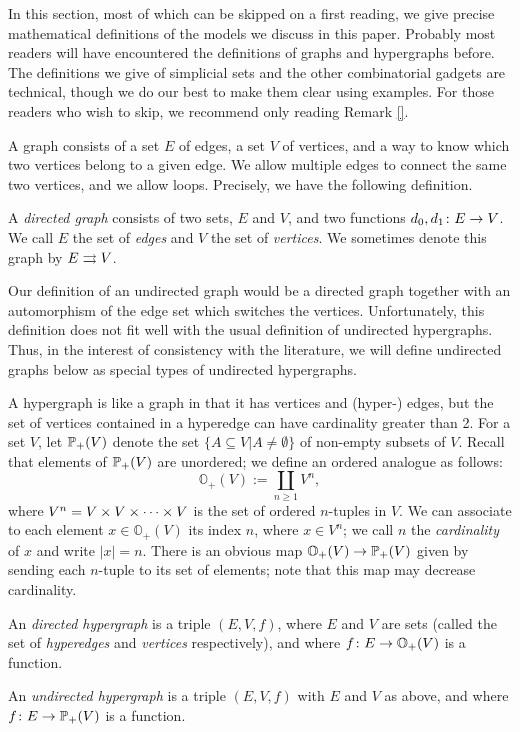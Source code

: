 \documentclass{amsart}
\def\ss{\subseteq}
\def\OO{{\mathbb O}}
\begin{document}
In this section, most of which can be skipped on a first reading, we give precise mathematical definitions of the models we discuss in this paper.  Probably most readers will have encountered the definitions of graphs and hypergraphs before.  The definitions we give of simplicial sets and the other combinatorial gadgets are technical, though we do our best to make them clear using examples.  For those readers who wish to skip, we recommend only reading Remark \ref{}.

A graph consists of a set $E$ of edges, a set $V$ of vertices, and a way to know which two vertices belong to a given edge.  We allow multiple edges to connect the same two vertices, and we allow loops.  Precisely, we have the following definition.

\begin{definition}

A {\em directed graph} consists of two sets, $E$ and $V$, and two functions $d_0,d_1\colon E\rightarrow V$.  We call $E$ the set of {\em edges} and $V$ the set of {\em vertices}.  We sometimes denote this graph by $E\rightrightarrows V$.

\end{definition}

Our definition of an undirected graph would be a directed graph together with an automorphism of the edge set which switches the vertices.  Unfortunately, this definition does not fit well with the usual definition of undirected hypergraphs.  Thus, in the interest of consistency with the literature, we will define undirected graphs below as special types of undirected hypergraphs.

A hypergraph is like a graph in that it has vertices and (hyper-) edges, but the set of vertices contained in a hyperedge can have cardinality greater than 2.  For a set $V$, let ${\mathbb P}_+(V)$ denote the set $\{A\ss V|A\neq\emptyset\}$ of non-empty subsets of $V$.  Recall that elements of ${\mathbb P}_+(V)$ are unordered; we define an ordered analogue as follows: $$\OO_+(V):=\coprod_{n\geq 1} V^n,$$ where $V^n=V\times V\times\cdots\times V$ is the set of ordered $n$-tuples in $V$.  We can associate to each element $x\in\OO_+(V)$ its index $n$, where $x\in V^n$; we call $n$ the {\em cardinality} of $x$ and write $|x|=n$. There is an obvious map $\OO_+(V)\to\PP_+(V)$ given by sending each $n$-tuple to its set of elements; note that this map may decrease cardinality.   

\begin{definition}

An {\em directed hypergraph} is a triple $(E,V,f)$, where $E$ and $V$ are sets (called the set of {\em hyperedges} and {\em vertices} respectively), and where $f\taking E\to\OO_+(V)$ is a function.

An {\em undirected hypergraph} is a triple $(E,V,f)$ with $E$ and $V$ as above, and where $f\colon E\rightarrow{\mathbb P}_+(V)$ is a function.

\end{definition}
\end{document}
